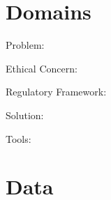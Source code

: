 \documentclass[dvipsnames,mathserif]{beamer}
\begin{document}
{    \section{Domains}

    \begin{frame}

      \large Problem:

    \end{frame}

    \begin{frame}

      \large Ethical Concern:

    \end{frame}


    \begin{frame}

      \large Regulatory Framework:


    \end{frame}


    \begin{frame}

      \large Solution:

    \end{frame}


    \begin{frame}

      \large Tools:

    \end{frame}



    \section{Data}

    \begin{frame}

    \end{frame}


}
\end{document}
